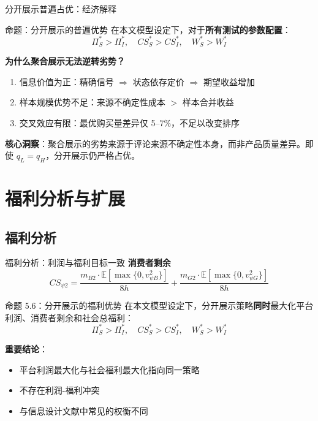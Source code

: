 \documentclass[aspectratio=169,10pt]{beamer}
\newcommand{\pos}[1]{\textcolor{positive}{#1}}
\newcommand{\con}[1]{\textcolor{negative}{#1}}
\newcommand{\HL}[1]{\textcolor{emphasis}{#1}}
\newcommand{\E}{\mathbb{E}}
\begin{document}
\begin{frame}{分开展示普遍占优：经济解释}
\begin{block}{命题：分开展示的普遍优势}
在本文模型设定下，对于\textbf{所有测试的参数配置}：
\[
\Pi_S^* > \Pi_I^*, \quad CS_S^* > CS_I^*, \quad W_S^* > W_I^*
\]
\end{block}

\vspace{6pt}
\textbf{为什么聚合展示无法逆转劣势？}
\begin{enumerate}
    \item \pos{信息价值为正}：精确信号 $\Rightarrow$ 状态依存定价 $\Rightarrow$ 期望收益增加
    \item \con{样本规模优势不足}：来源不确定性成本 $>$ 样本合并收益
    \item \con{交叉效应有限}：最优购买量差异仅 5--7\%，不足以改变排序
\end{enumerate}

\vspace{6pt}
\textbf{核心洞察}：聚合展示的劣势来源于\HL{评论来源不确定性}本身，而非产品质量差异。即使 $q_L = q_H$，分开展示仍严格占优。
\end{frame}

\section{福利分析与扩展}

\subsection{福利分析}

\begin{frame}{福利分析：利润与福利目标一致}
\textbf{消费者剩余}
\[
CS_{\psi 2} = \frac{m_{B2} \cdot \E[\max\{0, v_{\psi B}^2\}]}{8h} + \frac{m_{G2} \cdot \E[\max\{0, v_{\psi G}^2\}]}{8h}
\]

\vspace{6pt}
\begin{block}{命题 5.6：分开展示的福利优势}
在本文模型设定下，分开展示策略\textbf{同时}最大化平台利润、消费者剩余和社会总福利：
\[
\Pi_S^* > \Pi_I^*, \quad CS_S^* > CS_I^*, \quad W_S^* > W_I^*
\]
\end{block}

\vspace{6pt}
\textbf{重要结论}：
\begin{itemize}
    \item 平台利润最大化与社会福利最大化\HL{指向同一策略}
    \item \pos{不存在利润-福利冲突}
    \item 与信息设计文献中常见的权衡不同
\end{itemize}
\end{frame}
\end{document}
